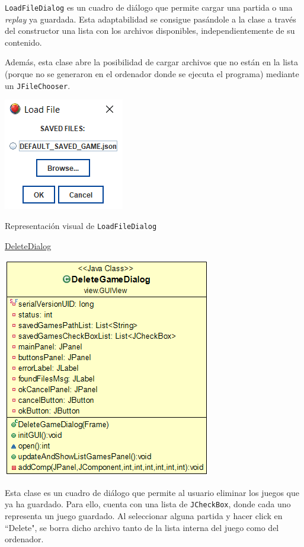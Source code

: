 \documentclass[12pt,a4paper,openright]{book}
\theoremstyle{break}
\begin{document}
\texttt{LoadFileDialog} es un cuadro de diálogo que permite cargar una partida o una \textit{replay} ya guardada. Esta adaptabilidad se consigue pasándole a la clase a través del constructor una lista con los archivos disponibles, independientemente de su contenido.

Además, esta clase abre la posibilidad de cargar archivos que no están en la lista (porque no se generaron en el ordenador donde se ejecuta el programa) mediante un \texttt{JFileChooser}.

\begin{center}
\includegraphics[scale=1]{load-game-sprint-6.png}

Representación visual de \texttt{LoadFileDialog}
\end{center}

\newpage

\underline{DeleteDialog}
\begin{center}
\includegraphics[scale=0.6]{deletedialog.png}
\end{center}

Esta clase es un cuadro de diálogo que permite al usuario eliminar los juegos que ya ha guardado. Para ello, cuenta con una lista de \texttt{JCheckBox}, donde cada uno representa un juego guardado. Al seleccionar alguna partida y hacer click en ``Delete", se borra dicho archivo tanto de la lista interna del juego como del ordenador.
\end{document}
